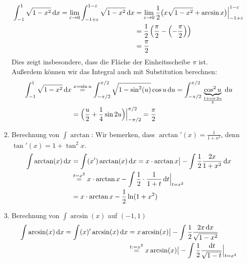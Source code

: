 \begin{example}
\begin{example}
\begin{enumerate}
	\begin{equation*}
		\begin{split}
		\int_{-1}^1 \sqrt{1-x^2} \, \mathrm{d} x = \lim\limits_{\varepsilon \to 0} \int_{-1+\varepsilon}^{1-\varepsilon} \sqrt{1-x^2} \, \mathrm{d} x & = \lim\limits_{\varepsilon \to 0} \frac{1}{2} \big(x \sqrt{1-x^2} + \arcsin x\big) \Big\vert_{-1+\varepsilon}^{1-\varepsilon} \\
		& = \frac{1}{2} \left( \frac{\pi}{2} - \left( - \frac{\pi}{2} \right) \right) \\ 
		& = \frac{\pi }{2}
		\end{split}
	\end{equation*}
	Dies zeigt insbesondere, dass die Fläche der Einheitsscheibe $\pi$ ist.  \\ Außerdem können wir das Integral auch mit Substitution berechnen: 
	\begin{equation*}
	\begin{split}
	 \int_{-1}^1 \sqrt{1-x^2} \, \mathrm{d} x & \overset{x= \sin u}= \int^{\pi/2}_{-\pi/2} \sqrt{1-\sin^2(u)} \cos u \, \mathrm{d} u  = \int_{-\pi/2}^{\pi/2} \underbrace{\cos^2 u}_{ \frac{1+\cos 2u}{2}} \, \mathrm{d} u \\
		& = 	\Big(\frac{u}{2}+\frac{1}{4}\sin 2u\Big) \Big\vert_{-\pi/2}^{\pi/2} = \frac{\pi}{2}
	 \end{split}
	\end{equation*}
	\item Berechnung von $\int \arctan$: Wir bemerken, dass $\arctan ' (x)=\frac{1}{1+x^2}$, denn $\tan'(x)=1+\tan^2x $.
	\begin{equation*}
	\begin{split}
	  \int \arctan(x) \, \mathrm{d} x &= \int (x')\arctan(x) \, \mathrm{d} x = x \cdot \arctan x \big\vert - \int \frac{1}{2} \frac{2x}{1+x^2} \, \mathrm{d} x \\
	  &  \overset{t = x^2}= x \cdot \arctan x - \int \frac{1}{2} \cdot \frac{1}{1+t} \, \mathrm{d} t \Big\vert_{t=x^2} \\
	  & = x \cdot \arctan x - \frac{1}{2} \ln (1+x^2)
	  	\end{split}
	\end{equation*}
	\item Berechnung von $\int \arcsin(x)$ auf $(-1,1)$
	\begin{equation*}
	\begin{split}
		\int \arcsin(x) \D x = \int (x)' \arcsin(x) \D x & = x\arcsin(x) \big\vert - \int \frac{1}{2} \frac{2 x \D x}{\sqrt{1-x^2}} \\
		& \overset{t:= x^2}= x\arcsin (x) \big\vert - \int \frac{1}{2} \frac{\D t}{\sqrt{1-t}}  \Big\vert_{t=x^2}	 \\

\end{split}
\end{equation*}
\end{enumerate}
\end{example}
\end{example}
